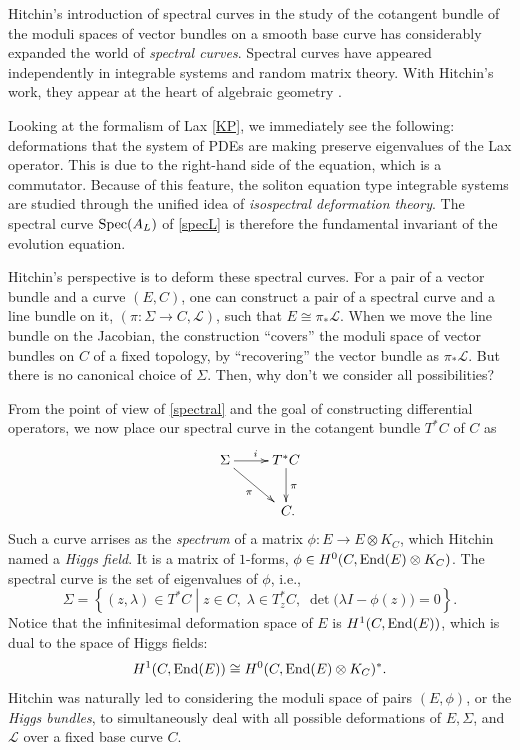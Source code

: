 \documentclass{amsart}
\theoremstyle{definition}
\numberwithin{equation}{section}
\numberwithin{figure}{section}
\def\End{{\text{\rm{End}}}}
\def\isom{\cong}
\def\tensor{\otimes}
\def\lam{\lambda}
\def\Spec{{\text{\rm{Spec}}}}
\newcommand{\be}{\begin{equation}}
\newcommand{\ee}{\end{equation}}
\newcommand{\cL}{{\mathcal{L}}}
\newcommand{\rar}{\rightarrow}
\newcommand{\lrar}{\longrightarrow}
\begin{document}
Hitchin's introduction \cite{H1} of spectral curves in the study of 
the cotangent bundle of the moduli spaces of vector bundles on a
 smooth base curve has considerably 
expanded the world of \emph{spectral curves}. 
Spectral curves have appeared independently
 in integrable systems and random matrix theory.
With  Hitchin's work, they appear at the heart of 
algebraic geometry \cite{BNR}. 

Looking at the formalism of Lax \eqref{KP}, we immediately see the following:
deformations that the system of PDEs are making
preserve eigenvalues of the Lax operator. This is due to the right-hand side
of the equation, which is a commutator. Because of this feature,
the soliton equation type integrable systems are studied through the 
unified idea of \emph{isospectral deformation theory}.
The spectral curve $\Spec(A_L)$ of \eqref{specL} is therefore 
the fundamental invariant of the evolution equation. 

Hitchin's perspective is to deform these spectral curves. For a pair of 
a vector bundle and a curve $(E,C)$, one can construct a pair of 
a spectral curve and a line bundle on it, $(\pi:\Sigma\rar C, \cL)$,
such that $E\isom \pi_* \cL$. When we move the line bundle on the 
Jacobian, the construction ``covers'' the moduli space of 
vector bundles on $C$ of a fixed topology, by
``recovering'' the vector bundle as $\pi_*\cL$. 
But there is no canonical choice of $\Sigma$. 
Then, why don't  we consider all possibilities?

From the point of view of \eqref{spectral} and the goal of 
constructing differential operators, we now place our spectral curve 
in the cotangent bundle $T^*C$ of $C$ as
\be
\label{Hitchinspectral}
\xymatrix{
\Sigma \ar[dr]_{\pi}\ar[r]^{i} 
&{T^*C}\ar[d]^{\pi}
\\
&\;C	.}
\ee
Such a curve arrises as the \emph{spectrum} of a matrix
$\phi: E\lrar E\tensor K_C$, which Hitchin named a
\emph{Higgs field}. It is a matrix of $1$-forms, $\phi\in H^0(C, \End(E)\tensor  K_C)$.
The spectral curve is the set of 
eigenvalues of $\phi$, i.e., 
$$
\Sigma=\left\{ (z,\lam)\in T^*C\;\left|\;z\in C,\; \lam\in T^*_z C, \;
\det\big(\lam I - \phi(z)\big)=0\right\}\right. .
$$
Notice that the infinitesimal deformation 
space of $E$ is $H^1(C,\End(E))$, which is dual to the space
of Higgs fields:
\be
\label{Serre}
H^1(C,\End(E)) \isom H^0(C, \End(E)\tensor  K_C)^*.
\ee
Hitchin was  naturally led to considering the moduli space of 
pairs $(E,\phi)$, or 
the \emph{Higgs bundles}, to simultaneously deal with
all possible deformations of $E, \Sigma$, and $\cL$ over a fixed
base curve $C$.
\end{document}
